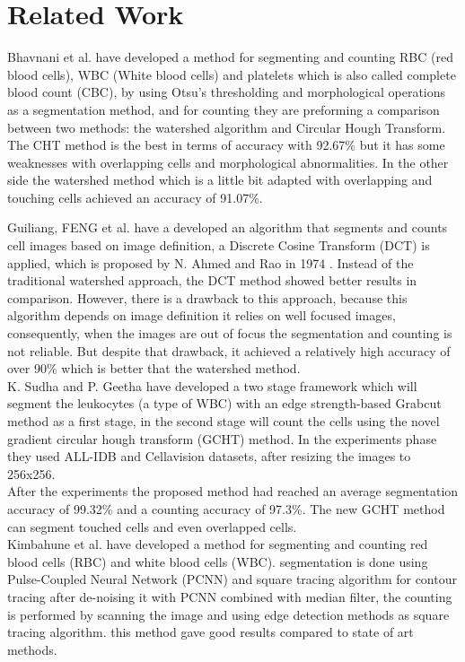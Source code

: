 \documentclass[conference]{IEEEtran}
\begin{document}
\section{Related Work}
Bhavnani et al. \cite{bhavnani2016segmentation} have developed a method for segmenting and counting RBC (red blood cells), WBC (White blood cells) and platelets which is also called complete blood count (CBC), by using Otsu’s thresholding and morphological operations as a segmentation method, and for counting they are preforming a comparison between two methods: the watershed algorithm and Circular Hough Transform. The CHT method is the best in terms of accuracy with 92.67\% but it has some weaknesses with overlapping cells and morphological abnormalities. In the other side the watershed method which is a little bit adapted with overlapping and touching cells achieved an accuracy of 91.07\%.\

Guiliang, FENG et al.\cite{guiliang2016microscopic} have a developed an algorithm that segments and counts cell images based on image definition, a Discrete Cosine Transform (DCT) is applied, which is proposed by N. Ahmed and Rao in 1974 \cite{ahmed1974discrete}. Instead of the traditional watershed approach, the DCT method showed better results in comparison. However, there is a drawback to this approach, because this algorithm depends on image definition it relies on well focused images, consequently, when the images are out of focus the segmentation and counting is not reliable. But despite that drawback, it achieved a relatively high accuracy of over 90\% which is better that the watershed method.\\

K. Sudha and P. Geetha \cite{SUDHA2020639} have developed a two stage framework which will segment the leukocytes (a type of WBC) with an edge strength-based Grabcut method as a first stage, in the second stage will count the cells using the novel gradient circular hough transform (GCHT) method. In the experiments phase they used ALL-IDB \cite{labati2011all} and Cellavision \cite{Zheng2018} datasets, after resizing the images to 256x256.\\
After the experiments the proposed method had reached an average segmentation accuracy of 99.32\% and a counting accuracy of 97.3\%. The new GCHT method can segment touched cells and even overlapped cells.\\

Kimbahune et al. \cite{kimbahune2011blood} have developed a method for segmenting and counting red blood cells (RBC) and white blood cells (WBC).
segmentation is done using Pulse-Coupled Neural Network (PCNN) and square tracing algorithm for contour tracing after de-noising it with PCNN combined with median filter, the counting is performed by scanning the image and using edge detection methods as square tracing algorithm. this method gave good results compared to state of art methods.\\
\end{document}
